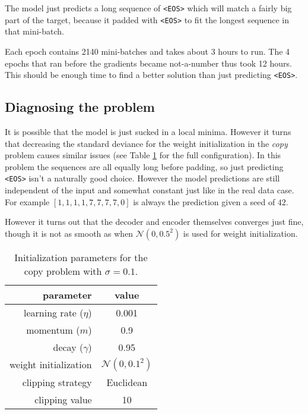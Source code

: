 The model just predicts a long sequence of \texttt{<EOS>} which will match a fairly big part of the target, because it padded with \texttt{<EOS>} to fit the longest sequence in that mini-batch.

Each epoch contains 2140 mini-batches and takes about 3 hours to run. The 4 epochs that ran before the gradients became not-a-number thus took 12 hours. This should be enough time to find a better solution than just predicting \texttt{<EOS>}.

\subsection{Diagnosing the problem}

It is possible that the model is just sucked in a local minima. However it turns that decreasing the standard deviance for the weight initialization in the \textit{copy} problem causes similar issues (see Table \ref{fig:results:sutskever:copy-parameters} for the full configuration). In this problem the sequences are all equally long before padding, so just predicting \texttt{<EOS>} isn't a naturally good choice. However the model predictions are still independent of the input and somewhat constant just like in the real data case. For example $[1, 1,1,1, 7, 7, 7, 7, 0]$ is always the prediction given a seed of $42$.

However it turns out that the decoder and encoder themselves converges just fine, though it is not as smooth as when $\mathcal{N}(0, 0.5^2)$ is used for weight initialization.
\begin{table}[h]
\centering
\begin{tabular}{r|c}
	parameter & value \\ \hline
	learning rate ($\eta$) & 0.001 \\
	momentum ($m$) & 0.9 \\
	decay ($\gamma$) & 0.95 \\
	weight initialization & $\mathcal{N}(0, 0.1^2)$ \\
	clipping strategy & Euclidean \\
	clipping value & 10
\end{tabular}
\caption{Initialization parameters for the copy problem with $\sigma = 0.1$.}
\label{fig:results:sutskever:copy-parameters}
\end{table}

